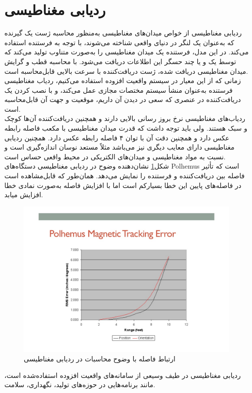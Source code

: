 \section{ردیابی مغناطیسی\protect{}}
ردیابی مغناطیسی از خواص میدان‌های مغناطیسی به‌منظور محاسبه ژست یک گیرنده  که به‌عنوان یک لنگر در دنیای واقعی شناخته می‌شوند، با توجه به فرستنده استفاده می‌کند. در این مدل، فرستنده یک میدان مغناطیسی را به‌صورت متناوب تولید می‌کند که توسط یک و یا چند حسگر این اطلاعات دریافت می‌شود. با محاسبه قطب و گرایش میدان مغناطیسی دریافت شده، ژست دریافت‌کننده با سرعت بالایی قابل‌محاسبه است.
\\
زمانی که از این معیار در سیستم واقعیت افزوده استفاده می‌کنیم، ردیاب مغناطیسی فرستنده به‌عنوان منشأ سیستم مختصات مجازی عمل می‌کند، و با نصب کردن یک دریافت‌کننده در عنصری که سعی در دیدن آن داریم، موقعیت و جهت آن قابل‌محاسبه است\cite{caudell1992augmented}. 
\\
ردیاب‌های مغناطیسی نرخ بروز رسانی بالایی دارند و همچنین دریافت‌کننده آن‌ها کوچک و سبک هستند. ولی باید توجه داشت که قدرت میدان مغناطیسی با مکعب فاصله رابطه عکس دارد و همچنین دقت آن با توان ۴ فاصله رابطه عکس دارد. همچنین ردیابی مغناطیسی دارای معایب دیگری نیز می‌باشد مثلاً مستعد نوسان اندازه‌گیری است و نسبت به مواد مغناطیسی و میدان‌های الکتریکی در محیط واقعی حساس است.
\\
شکل\ref{fig:magnetic} نشان‌دهنده وضوح در ردیابی مغناطیسی دستگاه‌های Polhemus است که تأثیر فاصله بین دریافت‌کننده و فرستنده را نمایش می‌دهد. همان‌طور که قابل‌مشاهده است در فاصله‌های پایین این خطا بسیارکم است اما با افزایش فاصله به‌صورت نمادی خطا افزایش میابد.
\begin{figure}
	\centering
	\includegraphics[width=1\linewidth]{image/magnetic}
	\caption {ارتباط فاصله با وضوح محاسبات در ردیابی مغناطیسی\protect{}}
	\label{fig:magnetic}
\end{figure}
ردیابی مغناطیسی در طیف وسیعی از سامانه‌های واقعیت افزوده استفاده‌شده است، مانند برنامه‌هایی در حوزه‌های تولید\cite{caudell1992augmented}، نگهداری\cite{feiner1993knowledge}، سلامت\cite{bajura1992merging}.
